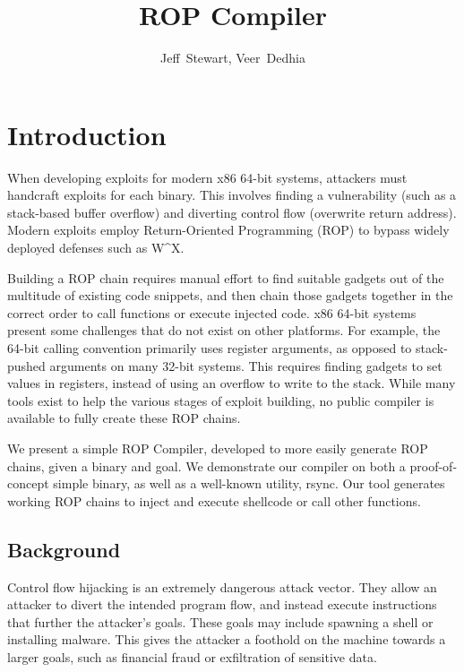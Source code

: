 \documentclass[journal]{IEEEtran}
\begin{document}
%
\title{ROP Compiler}

\author{Jeff~Stewart,
        Veer~Dedhia}



\maketitle

\section{Introduction}

When developing exploits for modern x86 64-bit systems, attackers must handcraft
exploits for each binary. This involves finding a vulnerability (such
as a stack-based buffer overflow) and diverting control flow (overwrite return
address). Modern exploits employ Return-Oriented Programming (ROP) to bypass widely
deployed defenses such as W\^{}X.

Building a ROP chain requires manual effort to find suitable gadgets out of the
multitude of existing code snippets, and then chain those gadgets together in
the correct order to call functions or execute injected code. x86 64-bit systems
present some challenges that do not exist on other platforms. For example, the
64-bit calling convention primarily uses register arguments, as opposed to
stack-pushed arguments on many 32-bit systems. This requires finding gadgets to
set values in registers, instead of using an overflow to write to the stack.
While many tools exist to help the various stages of exploit building, no public
compiler is available to fully create these ROP chains.

We present a simple ROP Compiler, developed to more easily generate ROP chains,
given a binary and goal. We demonstrate our compiler on both a proof-of-concept
simple binary, as well as a well-known utility, rsync. Our tool generates
working ROP chains to inject and execute shellcode or call other functions.

\subsection{Background}
Control flow hijacking is an extremely dangerous attack vector. They allow an
attacker to divert the intended program flow, and instead execute instructions
that further the attacker's goals. These goals may include spawning a shell or
installing malware. This gives the attacker a foothold on the machine towards a
larger goals, such as financial fraud or exfiltration of sensitive data.
\end{document}
